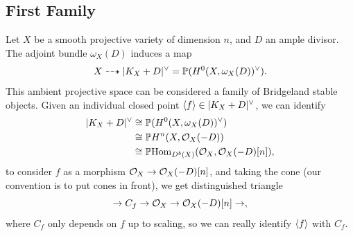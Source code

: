 \documentclass[12pt]{article}
\begin{document}



\subsection{First Family}

Let $X$ be a smooth projective variety of dimension $n$, and $D$ an ample divisor. The adjoint bundle $\omega_X(D)$ induces a map
\[X \dashrightarrow |K_X+D|^\vee = \P(H^0(X,\omega_X(D))^\vee).\]
This ambient projective space can be considered a family of Bridgeland stable objects. Given an individual closed point $\<f\> \in |K_X+D|^\vee$, we can identify
\begin{align*}
    |K_X+D|^\vee &\cong \P(H^0(X,\omega_X(D))^\vee)\\
    &\cong \P H^n(X,\cO_X(-D))\\
    &\cong \P \Hom_{D^b(X)}(\cO_X,\cO_X(-D)[n]),
\end{align*}
to consider $f$ as a morphism $\cO_X\to \cO_X(-D)[n]$, and taking the cone (our convention is to put cones in front), we get distinguished triangle
\[\to C_f \to \cO_X \to \cO_X(-D)[n] \to,\]
where $C_f$ only depends on $f$ up to scaling, so we can really identify $\<f\>$ with $C_f$.
\end{document}
